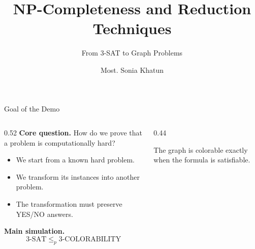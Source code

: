 \documentclass[aspectratio=43,8pt]{beamer}
\title{NP-Completeness and Reduction Techniques}
\subtitle{From 3-SAT to Graph Problems}
\author{Most. Sonia Khatun}
\institute{Green University of Bangladesh}
\date{}
\begin{document}
\begin{frame}[plain]
    \titlepage
\end{frame}

\begin{frame}{Goal of the Demo}
\begin{columns}[T]
\begin{column}{0.52\textwidth}
\textbf{Core question.} How do we prove that a problem is computationally hard?
\vspace{0.25cm}
\begin{itemize}
    \item We start from a known hard problem.
    \item We transform its instances into another problem.
    \item The transformation must preserve YES/NO answers.
\end{itemize}
\vspace{0.2cm}
\textbf{Main simulation.}
\[
3\text{-SAT} \le_p 3\text{-COLORABILITY}
\]
\end{column}
\begin{column}{0.44\textwidth}
\centering
{}
\vspace{0.2cm}
\small
The graph is colorable exactly when the formula is satisfiable.
\end{column}
\end{columns}
\end{frame}
\end{document}
